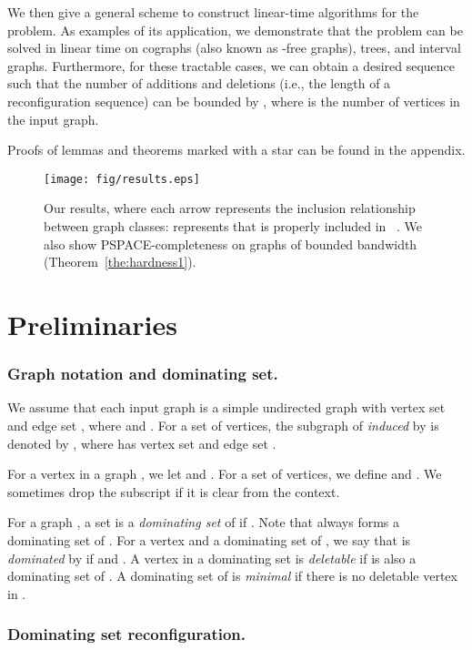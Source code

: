 \documentclass{llncs}
\begin{document}
We then give a general scheme to construct linear-time algorithms for the problem.
As examples of its application, we demonstrate that the problem can
be solved in linear time on cographs (also known as -free graphs), trees, and interval graphs.
Furthermore, for these tractable cases, we can obtain a desired sequence such
that the number of additions and deletions (i.e., the length of a reconfiguration sequence) can
be bounded by , where  is the number of vertices in the input graph.
	
Proofs of lemmas and theorems marked with a star can be found in the appendix.

\begin{figure}[t]
    \centering
	\texttt{[image: fig/results.eps]}
	\vspace{-1em}
	\caption{Our results, where each arrow represents the inclusion relationship between graph classes:
			 represents that  is properly included in ~\cite{BLS99}.
We also show PSPACE-completeness on graphs of bounded bandwidth (Theorem~\ref{the:hardness1}).}
	\vspace{-1em}
    \label{fig:results}
\end{figure}

\section{Preliminaries}


\subsubsection{Graph notation and dominating set.}

We assume that each input graph  is a simple undirected graph with vertex set 
and edge set , where  and .
For a set  of vertices, the subgraph of  {\em induced} by  is
denoted by , where  has vertex set  and edge set .

For a vertex  in a graph , we let  and .
For a set  of vertices, we define  and .
We sometimes drop the subscript  if it is clear from the context.

For a graph , a set  is a {\em dominating set} of  if .
Note that  always forms a dominating set of .
For a vertex  and a dominating set  of , we say that  is {\em dominated} by  if  and .
A vertex  in a dominating set  is {\em deletable} if  is also a dominating set of .
A dominating set  of  is {\em minimal} if there is no deletable vertex in .

\subsubsection{Dominating set reconfiguration.}
	
\end{document}
